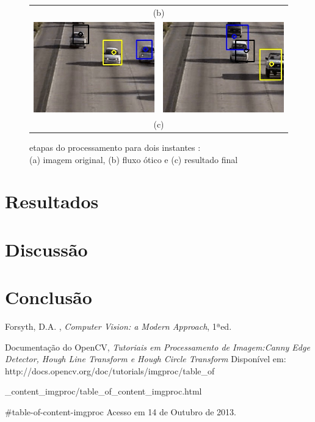 \documentclass[journal]{IEEEtran}
\begin{document}
\begin{figure}[h]
\begin{tabular}{cc}
		      \multicolumn{2}{c}{\scriptsize(b) }  \\
	\includegraphics[scale = 0.3]{./images/output1.jpg}& 
	\includegraphics[scale = 0.3]{./images/output2.jpg}\\
		      \multicolumn{2}{c}{\scriptsize(c) }
  \end{tabular}  
  \caption{etapas do processamento para dois instantes : \\
  (a) imagem original,
  (b) fluxo ótico e
  (c) resultado final}
  \label{fig:resultados}
\end{figure}



\section{Resultados}
\newpage
\section{Discussão}
\section{Conclusão}
\begin{thebibliography}{1}

Forsyth, D.A. , \emph{Computer Vision: a Modern Approach}, 1ªed.

 Documentação do OpenCV, \emph{Tutoriais em Processamento de 
Imagem:Canny Edge Detector, Hough Line Transform e
 Hough Circle Transform}
 Disponível em: http://docs.opencv.org/doc/tutorials/imgproc/table\_of
 
 \_content\_imgproc/table\_of\_content\_imgproc.html
 
 \#table-of-content-imgproc
	 Acesso em 14 de Outubro de 2013.
\end{thebibliography}
\end{document}
